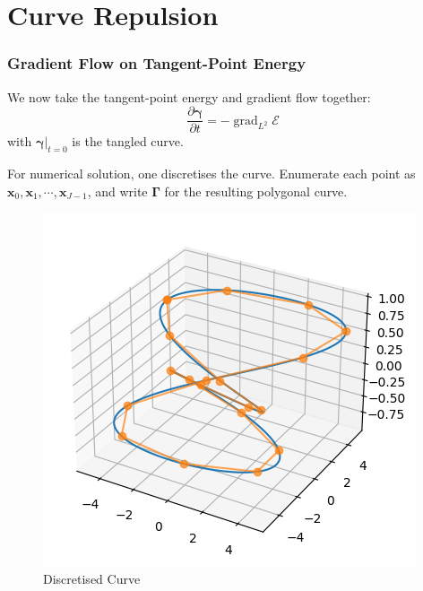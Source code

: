 \documentclass{beamer}
\theoremstyle{remark}
\newcommand{\gammabf}{\boldsymbol{\gamma}}
\newcommand{\Gammabf}{\boldsymbol{\Gamma}}
\newcommand{\xbf}{\mathbf{x}}
\DeclareMathOperator{\grad}{grad}
\begin{document}
\section{Curve Repulsion}
\begin{frame}
    \frametitle{Gradient Flow on Tangent-Point Energy}
    We now take the tangent-point energy and gradient flow together:
    \begin{equation}
        \frac{\partial \gammabf}{\partial t} = - \grad_{L^2} \mathcal{E}
    \end{equation}
    with $\left.\gammabf\right|_{t=0}$ is the tangled curve.

        \begin{multicols}{2}
            {
                For numerical solution, one discretises the curve.
            }
            {
                Enumerate each point as $\xbf_0, \xbf_1, \cdots, \xbf_{J-1}$, and write
                $\Gammabf$ for the resulting polygonal curve.
            }
            \columnbreak
            {
                \begin{figure}[h]
                    \centering
                    \includegraphics[scale=0.4]{discretization}
                    \caption{Discretised Curve}
                \end{figure}
            }
        \end{multicols}
\end{frame}
\end{document}
